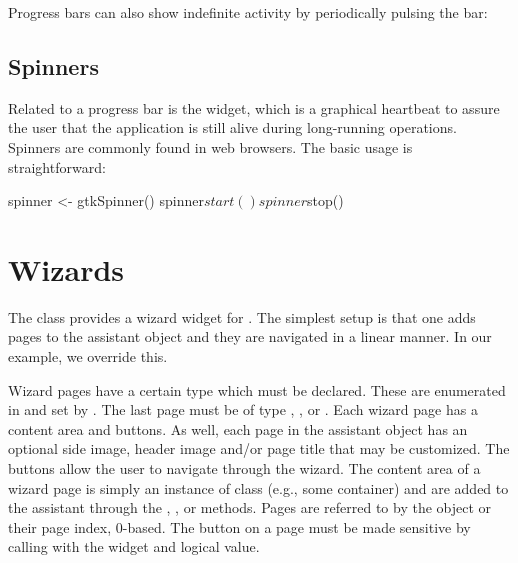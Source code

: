 Progress bars can also show indefinite activity by periodically
pulsing the bar: 
\begin{Schunk}
\end{Schunk}

\subsection{Spinners}

Related to a progress bar is the  widget, which is a
graphical heartbeat to assure the user that the application is still
alive during long-running operations. Spinners are commonly found in
web browsers. The basic usage is straightforward:
\begin{Schunk}
\begin{Sinput}
 spinner <- gtkSpinner()
 spinner$start()
 spinner$stop()
\end{Sinput}
\end{Schunk}


\section{Wizards}
\label{sec:gtk-wizards}

The  class provides a wizard widget for \GTK. The
simplest setup is that one adds pages to the assistant object and they
are navigated in a linear manner. In our example, we override this.

Wizard pages have a certain type which must be declared. These are
enumerated in  and set by
. The last page must be of type
, , or .  Each wizard
page has a content area and buttons.  As well, each page in the
assistant object has an optional side image, header image and/or page
title that may be customized. The buttons allow the user to navigate
through the wizard. The content area of a wizard page is simply an
instance of class  (e.g., some container) and are
added to the assistant through the ,
, or
 methods. Pages are referred to by
the  object or their page index, $0$-based. The
 button on a page must be made sensitive by calling
 with the widget and logical
value.

